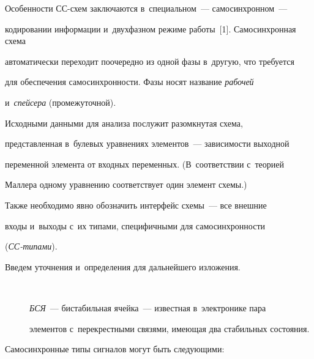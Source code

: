        


   Особенности СС-схем заключаются в~специальном~--- самосинхронном~--- 


кодировании информации и~двухфазном режиме работы~[1]. Самосинхронная схе\-ма 


автоматически переходит поочередно из одной фазы в~другую, что требуется 


для обеспечения самосинхронности. Фазы носят название \textit{рабочей} 


и~\textit{спейсера} (промежуточной).


   


   Исходными данными для анализа послужит разомкнутая схема, 


пред\-став\-лен\-ная в~булевых уравнениях элементов~--- зависимости выходной 


переменной элемента от входных переменных. (В~соответствии с~теорией 


Маллера одному уравнению соответствует один элемент схемы.)


   


   Также необходимо явно обозначить интерфейс схемы~--- все внешние 


входы и~выходы с~их типами, специфичными для самосинхронности 


(\textit{СС-ти\-пами}).


   


   Введем уточнения и~определения для дальнейшего изложения.


  \begin{description} 


\item[\,]  \textit{БСЯ}~--- бистабильная ячейка~--- известная в~электронике пара 


элементов с~перекрестными связями, имеющая два стабильных состояния.


\end{description}


   


   Самосинхронные типы сигналов могут быть следующими:


